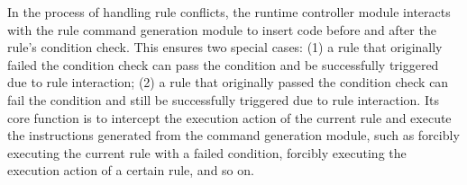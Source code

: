 In the process of handling rule conflicts, the runtime controller module interacts with the rule command generation module to insert code before and after the rule's condition check. This ensures two special cases: (1) a rule that originally failed the condition check can pass the condition and be successfully triggered due to rule interaction; (2) a rule that originally passed the condition check can fail the condition and still be successfully triggered due to rule interaction. Its core function is to intercept the execution action of the current rule and execute the instructions generated from the command generation module, such as forcibly executing the current rule with a failed condition, forcibly executing the execution action of a certain rule, and so on.
